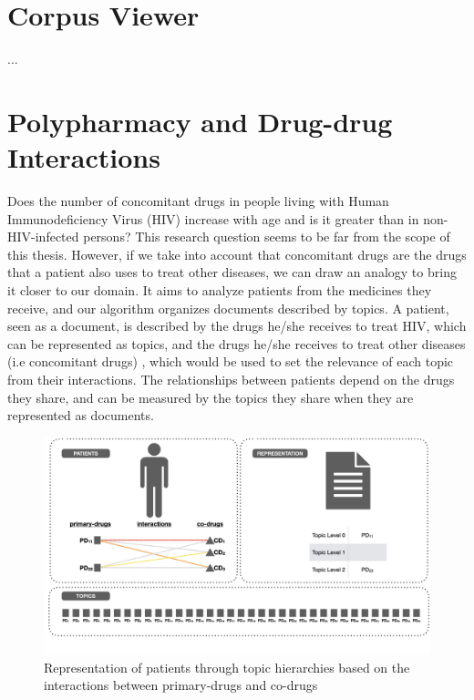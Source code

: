 \section{Corpus Viewer}
\label{sec:corpus-viewer}
...


\section{Polypharmacy and Drug-drug Interactions}
\label{sec:polypharmacy}

Does the number of concomitant drugs in people living with Human Immunodeficiency Virus (HIV) increase with age and is it greater than in non-HIV-infected persons? This research question \citep{Badenes-Olmedo2019c} seems to be far from the scope of this thesis. However, if we take into account that  concomitant drugs are the drugs that a patient also uses to treat other diseases, we can draw an analogy to bring it closer to our domain. It aims to analyze patients from the medicines they receive, and our algorithm organizes documents described by topics. A patient, seen as a document, is described by the drugs he/she receives to treat HIV, which can be represented as topics, and the drugs he/she receives to treat other diseases (i.e concomitant drugs) , which would be used to set the relevance of each topic from their interactions. The relationships between patients depend on the drugs they share, and can be measured by the topics they share when they are represented as documents.


\begin{figure}[ht]
    \centering
    \includegraphics[width=0.7\linewidth]{polypharmacy.png}
    \caption{Representation of patients through topic hierarchies based on the interactions between primary-drugs and co-drugs}
    \label{fig:polypharmacy-topics}
\end{figure}

